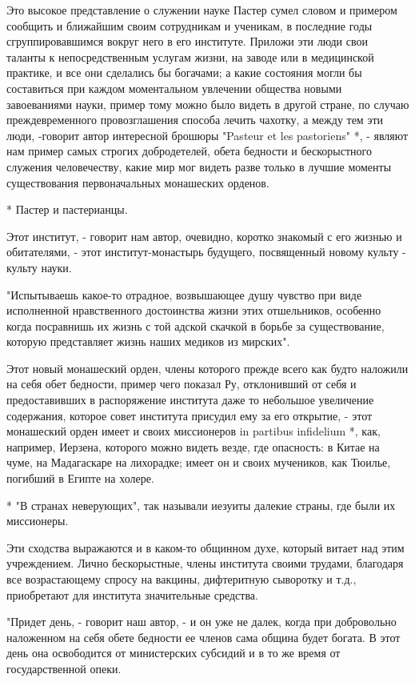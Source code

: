 Это высокое  представление  о  служении  науке  Пастер  сумел  словом  и
примером сообщить и ближайшим своим сотрудникам и ученикам, в  последние
годы сгруппировавшимся вокруг  него в  его институте.  Приложи эти  люди
свои  таланты  к  непосредственным  услугам  жизни,  на  заводе  или   в
медицинской практике, и все они сделались бы богачами; а какие состояния
могли бы составиться при  каждом моментальном увлечении общества  новыми
завоеваниями науки, пример тому  можно было видеть  в другой стране,  по
случаю преждевременного провозглашения способа  лечить чахотку, а  между
тем  эти  люди,  -говорит  автор  интересной  брошюры  "Pasteur  et  les
pastoriens" *, -  являют нам  пример самых  строгих добродетелей,  обета
бедности и  бескорыстного служения  человечеству, какие  мир мог  видеть
разве только в  лучшие моменты  существования первоначальных  монашеских
орденов.

* Пастер и пастерианцы.

Этот институт, -  говорит нам  автор, очевидно, коротко  знакомый с  его
жизнью и обитателями,  - этот  институт-монастырь будущего,  посвященный
новому культу - культу науки.

"Испытываешь какое-то отрадное, возвышающее душу чувство при виде
исполненной нравственного достоинства жизни этих отшельников, особенно
когда посравнишь их жизнь с той адской скачкой в борьбе за
существование, которую представляет жизнь наших медиков из мирских".

Этот новый  монашеский  орден, члены  которого  прежде всего  как  будто
наложили на себя обет бедности,  пример чего показал Ру, отклонивший  от
себя  и  предоставивших  в  распоряжение  института  даже  то  небольшое
увеличение содержания,  которое  совет  института присудил  ему  за  его
открытие, - этот монашеский орден имеет и своих миссионеров in  partibus
infidelium *, как, например, Иерзена,  которого можно видеть везде,  где
опасность: в Китае  на чуме,  на Мадагаскаре  на лихорадке;  имеет он  и
своих мучеников, как Тюилье, погибший в Египте на холере.

* "В странах неверующих", так называли иезуиты далекие страны, где
были их миссионеры.

Эти сходства выражаются и в  каком-то общинном духе, который витает  над
этим учреждением. Лично  бескорыстные, члены  института своими  трудами,
благодаря все  возрастающему спросу  на вакцины,  дифтеритную  сыворотку
и т.д., приобретают для института значительные средства.

"Придет день, - говорит наш автор, - и он уже не далек, когда при
добровольно наложенном на себя обете бедности ее членов сама община
будет богата. В этот день она освободится от министерских субсидий и в
то же время от государственной опеки.

